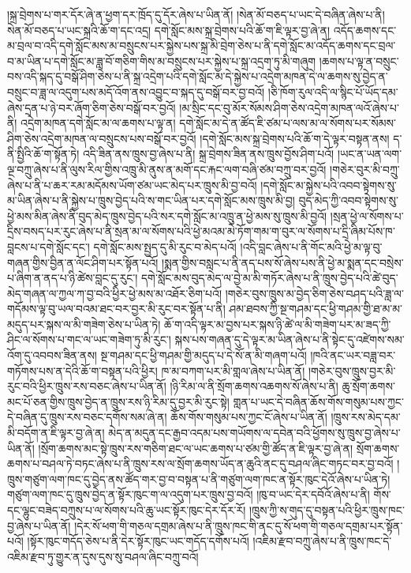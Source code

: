།སྐྲ་བྲེགས་པ་གར་དོར་ཞེ་ན་ཕྱག་དར་ཁྲོད་དུ་དོར་ཞེས་པ་ཡིན་ནོ། །སེན་མོ་བཅད་པ་ཡང་དེ་བཞིན་ཞེས་པ་ནི། སེན་མོ་བཅད་པ་ཡང་སྐྲའི་ཆོ་ག་དང་འདྲ། དགེ་སློང་མས་སྐྲ་བྲེགས་པའི་ཆོ་ག་ཇི་ལྟར་བྱ་ཞེ་ན། འདོད་ཆགས་དང་མ་བྲལ་བ་འདི་དགེ་སློང་མས་མ་བསྲུངས་པར་སྐྱེས་པས་སྐྲ་མི་བྲེག་ཅེས་པ་ནི་དགེ་སློང་མ་འདོད་ཆགས་དང་བྲལ་བ་མ་ཡིན་པ་དགེ་སློང་མ་ཟླ་བོ་གཅིག་གིས་མ་བསྲུངས་པར་སྐྱེས་པ་སྐྲ་འདྲག་ཏུ་མི་གཞུག །ཆགས་པ་ལྟ་ན་བསྲུང་བས་འདི་སྐད་དུ་བསྒོ་ཤིག་ཅེས་པ་ནི་སྐྲ་འདྲེག་པའི་དགེ་སློང་མ་དེ་སྐྱེས་པ་འདྲེག་མཁན་དེ་ལ་ཆགས་སུ་བྱེད་ན་བསྲུང་བ་ཟླ་ལ་འདུག་པས་མདོ་འོག་ནས་འབྱུང་བ་སྐད་དུ་བསྒོ་བར་བྱ་བའོ། །ཅི་ཁོག་རུལ་འདི་ལ་སྙིང་པོ་ཡོད་དམ་ཞེས་དྲན་པ་ཉེ་བར་ཞོག་ཅིག་ཅེས་བསྒོ་བར་བྱའོ། །མ་སྲིང་དང་བུ་མོར་སོམས་ཤིག་ཅེས་འདྲེག་མཁན་ལའོ་ཞེས་པ་ནི། འདྲེག་མཁན་དགེ་སློང་མ་ལ་ཆགས་པ་ལྟ་ན། དགེ་སློང་མ་དེ་ན་ཚོད་ཇི་ཙམ་པ་ལས་མ་ལ་སོགས་པར་སོམས་ཤིག་ཅེས་འདྲེག་མཁན་ལ་བསྲུངས་པས་བསྒོ་བར་བྱའོ། །དགེ་སློང་མས་སྐྲ་བྲེགས་པའི་ཆོ་ག་དེ་ལྟར་བསྟན་ནས། ད་ནི་སྤྱིའི་ཆོ་ག་སྟོན་ཏེ། འདི་ཟིན་ནས་ཁྲུས་བྱ་ཞེས་པ་ནི། སྐྲ་བྲེགས་ཟིན་ནས་ཁྲུས་བྱོས་ཤིག་པའོ། །ཡང་ན་ཡན་ལག་ལྔ་བཀྲུ་ཞེས་པ་ནི་ལུས་རིལ་གྱིས་འཁྲུ་མི་ནུས་ན་མགོ་དང་རྐང་ལག་བཞི་ཙམ་བཀྲུ་བར་བྱའོ། །གཅེར་བུར་མི་བཀྲུ་ཞེས་པ་ནི་པ་ཆར་རམ་མདོམས་ཡོག་ཙམ་ཡང་མེད་པར་ཁྲུས་མི་བྱ་བའོ། །དགེ་སློང་མ་སྐྱེས་པའི་འབབ་སྟེགས་སུ་མ་ཡིན་ཞེས་པ་ནི་སྐྱེས་པ་ཁྲུས་བྱེད་པའི་ས་གང་ཡིན་པར་དགེ་སློང་མས་ཁྲུས་མི་བྱ། བུད་མེད་ཀྱི་འབབ་སྟེགས་སུ་ཕྱེ་མས་མིན་ཞེས་ནི་བུད་མེད་ཁྲུས་བྱེད་པའི་སར་དགེ་སློང་མ་འཁྲུ་ན་ཕྱེ་མས་སུ་ཁྲུས་མི་བྱའོ། །སྲན་ཕྱེ་ལ་སོགས་པ་དྲིས་བསད་པར་རུང་ཞེས་པ་ནི་སྲན་མ་ལ་སོགས་པའི་ཕྱེ་མའམ་མེ་ཏོག་གམ་ག་བུར་ལ་སོགས་པ་དྲི་ཞིམ་པོས་ཁ་བླངས་པ་དགེ་སློང་དང་། དགེ་སློང་མས་སྤྱད་དུ་མི་རུང་བ་མེད་པའོ། །འདི་བླང་ཞེས་པ་ནི་གོང་མའི་ཕྱེ་མ་ལྟ་བུ་གཞན་གྱིས་བྱིན་ན་ལོང་ཤིག་པར་སྟོན་པའོ། །སྨན་གྱིས་བསླང་པ་ནི་ནད་པས་སོ་ཞེས་པས་ནི་ཕྱེ་མ་སྨན་དང་བསྲེས་པ་ཞིག་ན་ནད་པ་ཉི་ཚེས་བླང་དུ་རུང་། དགེ་སློང་མས་བུད་མེད་ལ་བྱེ་མ་མི་གཏོར་ཞེས་པ་ནི་ཁྲུས་བྱེད་པའི་ཚེ་བུད་མེད་གཞན་ལ་ཀྱལ་ཀ་བྱ་བའི་ཕྱིར་ཕྱེ་མས་མ་འཐོར་ཅིག་པའོ། །གཅེར་བུས་ཁྲུས་མ་བྱེད་ཅིག་ཅེས་བཤད་པའི་ཟླ་ལ་གདོམས་ལྟ་བུ་ཡལ་བའམ་ཐང་བར་བྱར་མི་རུང་བར་སྟོན་པ་ནི། ཤམ་ཐབས་ཀྱི་སྔ་གཤམ་དང་ཕྱི་གཤམ་གྱི་ཐ་མ་མ་མདུད་པར་སྐས་ལ་མི་གཟེག་ཅེས་པ་ཡིན་ཏེ། ཆོ་ག་འདི་ལྟར་མ་བྱས་པར་སྐས་ཉི་ཚེ་ལ་མི་གཟེག་པར་མ་ཟད་ཀྱི་ཤིང་ལ་སོགས་པ་གང་ལ་ཡང་གཟེག་ཏུ་མི་རུང་། སྐས་པས་གཞན་དུ་དེ་ལྟར་མ་ཡིན་ཞེས་པ་ནི་སྟེང་དུ་འཛེགས་སམ་འོག་དུ་འབབས་ཟིན་ནས། སྔ་གཤམ་དང་ཕྱི་གཤམ་གྱི་མདུད་པ་དེ་སོ་ན་མི་གཞག་པའོ། །ཁའི་ནང་ཡར་བཟླ་བར་གཏོགས་པས་ན་དེའི་ཆོ་ག་བསྟན་པའི་ཕྱིར། ཁ་མ་བཀག་པར་མི་གླལ་ཞེས་པ་ཡིན་ནོ། །གཅེར་བུས་ཁྲུས་བྱར་མི་རུང་བའི་ཕྱིར་ཁྲུས་རས་བཅང་ཞེས་པ་ཡིན་ནོ། །ཉི་རིམ་ལ་ནི་སྲོག་ཆགས་འཆགས་སོ་ཞེས་པ་ནི། ཆུ་སྲོག་ཆགས་མང་པོ་ཅན་གྱིས་ཁྲུས་བྱེད་ན་ཁྲུས་རས་ཉི་རིམ་དུ་བྱར་མི་རུང་སྟེ། གླན་པ་ཡང་དེ་བཞིན་ཆོས་གོས་གསུམ་པས་ཀྱང་དེ་བཞིན་དུ་ཁྲུས་རས་བཅང་དགོས་སམ་ཞེ་ན། ཆོས་གོས་གསུམ་པས་ཀྱང་ངོ་ཞེས་པ་ཡིན་ནོ། །ཁྲུས་རས་མེད་དམ་མི་བདོག་ན་ཇི་ལྟར་བྱ་ཞེ་ན། མེད་ན་མདུན་དང་རྒྱབ་འདམ་པས་གཡོགས་ལ་དབེན་བའི་ཕྱོགས་སུ་ཁྲུས་བྱ་ཞེས་པ་ཡིན་ནོ། །སྲོག་ཆགས་མང་སྟེ་ཁྲུས་རས་གཅིག་ཐང་ལ་ཡང་ཆགས་པ་ཙམ་གྱི་ཚོད་ན་ཇི་ལྟར་བྱ་ཞེ་ན། སྲོག་ཆགས་ཆགས་པ་བཤལ་ཏེ་བཏང་ཞེས་པ་ནི་ཁྲུས་རས་ལ་སྲོག་ཆགས་ཡོད་ན་ཆུའི་ནང་དུ་བཤལ་ཞིང་གཏང་བར་བྱ་བའོ། །ཁྲུས་གཙུག་ལག་ཁང་དུ་བྱེད་ནས་ཚོད་གར་བྱ་བ་བསྟན་པ་ནི་གཙུག་ལག་ཁང་ན་སྟོར་ཁུང་དེའོ་ཞེས་པ་ཡིན་ཏེ། གཙུག་ལག་ཁང་དུ་ཁྲུས་བྱེད་ན་སྟོར་ཁུང་ག་ལ་འདུག་པར་ཁྲུས་བྱ་བའོ། །ཁུ་བ་ཡང་དེར་དབོའོ་ཞེས་པ་ནི། གོས་དང་ལྷུང་བཟེད་བཀྲུས་པ་ལ་སོགས་པའི་ཆུ་ཡང་སྟོར་ཁུང་དེར་དོར་རོ། །ཁྲུས་ཀྱི་ས་གུད་དུ་བསྟན་པའི་ཕྱིར་ཁྲུས་ཁང་བྱ་ཞེས་པ་ཡིན་ནོ། །དེར་སོ་ཕག་གི་གཅལ་དགྲམ་ཞེས་པ་ནི་ཁྲུས་ཁང་གི་ནང་དུ་སོ་ཕག་གི་གཅལ་དགྲམ་པར་སྟོན་པའོ། །སྟོར་ཁུང་གདོད་ཅེས་པ་ནི་དེར་སྟོར་ཁུང་ཡང་གདོད་དགོས་པའོ། །འཇིམ་རྫབ་བཀྲུ་ཞེས་པ་ནི་ཁྲུས་ཁང་དེ་འཇིམ་རྫབ་ཏུ་གྱུར་ན་དུས་དུས་སུ་བཤལ་ཞིང་བཀྲུ་བའོ། 